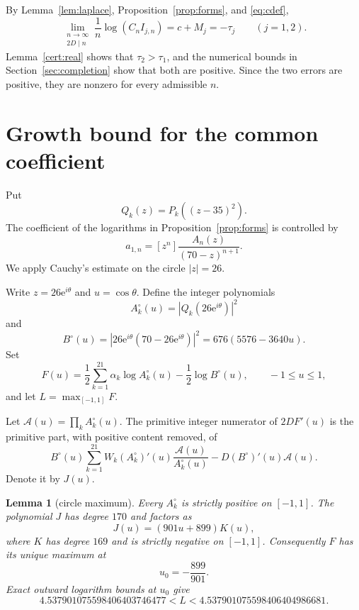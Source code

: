 \documentclass[preprint,12pt]{elsarticle}
\newtheorem{certificate}[theorem]{Lemma}
\theoremstyle{definition}
\newcommand{\e}{\mathrm e}
\begin{document}
By Lemma~\ref{lem:laplace}, Proposition~\ref{prop:forms}, and
\eqref{eq:cdef},
\begin{equation}\label{eq:error-rates}
 \lim_{\substack{n\to\infty\\2D\mid n}}
 \frac1n\log(C_n I_{j,n})
 =c+M_j=-\tau_j
 \qquad(j=1,2).
\end{equation}
Lemma~\ref{cert:real} shows that $\tau_2>\tau_1$, and the numerical
bounds in Section~\ref{sec:completion} show that both are positive.  Since
the two errors are positive, they are nonzero for every admissible $n$.

\section{Growth bound for the common coefficient}

Put
\[
 Q_k(z)=P_k((z-35)^2).
\]
The coefficient of the logarithms in Proposition~\ref{prop:forms} is
controlled by
\begin{equation}\label{eq:a1-coefficient}
 a_{1,n}=[z^n]\frac{A_n(z)}{(70-z)^{n+1}}.
\end{equation}
We apply Cauchy's estimate on the circle $|z|=26$.

Write $z=26\e^{i\theta}$ and $u=\cos\theta$.  Define the integer
polynomials
\begin{equation}\label{eq:circle-factors}
 A_k^\circ(u)=|Q_k(26\e^{i\theta})|^2
\end{equation}
and
\begin{equation}\label{eq:B-circle}
 B^\circ(u)=|26\e^{i\theta}(70-26\e^{i\theta})|^2
 =676(5576-3640u).
\end{equation}
Set
\begin{equation}\label{eq:F-circle}
 F(u)=\frac12\sum_{k=1}^{21}\alpha_k\log A_k^\circ(u)
 -\frac12\log B^\circ(u),
 \qquad -1\le u\le1,
\end{equation}
and let $L=\max_{[-1,1]}F$.

Let $\mathcal A(u)=\prod_k A_k^\circ(u)$.  The primitive integer numerator
of $2D F'(u)$ is the primitive part, with positive content removed, of
\begin{equation}\label{eq:J}
 B^\circ(u)\sum_{k=1}^{21}
 W_k(A_k^\circ)'(u)\frac{\mathcal A(u)}{A_k^\circ(u)}
 -D(B^\circ)'(u)\mathcal A(u).
\end{equation}
Denote it by $J(u)$.

\begin{certificate}[circle maximum]\label{cert:circle}
Every $A_k^\circ$ is strictly positive on $[-1,1]$.  The polynomial $J$
has degree $170$ and factors as
\begin{equation}\label{eq:J-factor}
 J(u)=(901u+899)K(u),
\end{equation}
where $K$ has degree $169$ and is strictly negative on $[-1,1]$.
Consequently $F$ has its unique maximum at
\[
 u_0=-\frac{899}{901}.
\]
Exact outward logarithm bounds at $u_0$ give
\begin{equation}\label{eq:L-bounds}
 4.537901075598406403746477
 <L<
 4.537901075598406404986681.
\end{equation}
\end{certificate}
\end{document}
